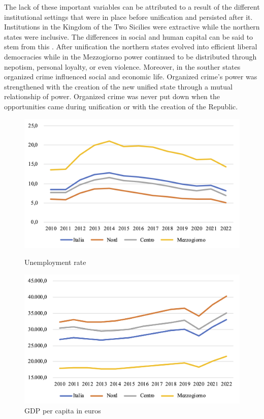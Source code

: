 \documentclass[12pt]{article}
\begin{document}
\begin{spacing}{1.5}
The lack of these important variables can be attributed to a result of the different institutional settings that were in place before unification and persisted after it. Institutions in the Kingdom of the Two Sicilies were extractive \cite{robinson2012nations} while the northern states were inclusive. The differences in social and human capital can be said to stem from this \cite{felice2013perche}. After unification the northern states evolved into efficient liberal democracies while in the Mezzogiorno power continued to be distributed through nepotism, personal loyalty, or even violence. Moreover, in the souther states organized crime influenced social and economic life. Organized crime's power was strengthened with the creation of the new unified state through a mutual relationship of power. Organized crime was never put down when the opportunities came during unification or with the creation of the Republic.

\begin{figure}
	\begin{minipage}[b]{0.5\textwidth}
		\begin{center}
			\includegraphics[width=\textwidth]{./images/unemployment-rate-regions.png}
		\end{center}
			\caption{Unemployment rate}
	\end{minipage}
	\begin{minipage}[b]{0.5\textwidth}
		\begin{center}
			\includegraphics[width=\textwidth]{./images/gdp-per-capita-regions.png}
		\end{center}
			\caption{GDP per capita in euros}
	\end{minipage}
\end{figure}


\end{spacing}
\end{document}
